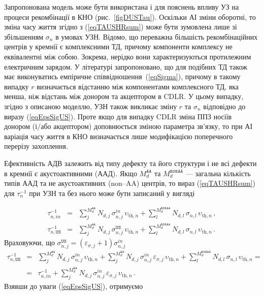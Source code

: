 Запропонована модель може бути використана і для пояснень впливу УЗ на процеси рекомбінації в КНО (рис.~\ref{figDUSTau}).
Оскільки АІ зміни оборотні, то зміна часу життя згідно з (\ref{eqTAUSHRsum}) може бути зумовлена лише зі збільшенням
$\sigma_n$ в умовах УЗН.
Відомо, що переважна більшість рекомбінаційних центрів у кремнії є комплексними ТД,
причому компоненти комплексу не еквівалентні між собою.
Зокрема, нерідко вони характеризуються протилежним електричним зарядом.
У літературі \cite{CDLR:R2} запропоновано, що для подібних ТД також має виконуватись емпіричне співвідношення~(\ref{eqSigma}),
причому в такому випадку $r$ визначається відстанню між компонентами комплексного ТД, яка  менша, ніж відстань між донором та акцептором в CDLR.
У цьому випадку, згідно з описаною моделлю, УЗН також викликає зміну $r$ та $\sigma_n$ відповідно до виразу (\ref{eqEpsSigUS}).
Проте якщо для випадку CDLR зміна ППЗ носіїв донором (і/або акцептором) доповнюється зміною параметра зв'язку,
то при АІ варіація часу життя в КНО визначається лише модифікацією поперечного перерізу захоплення.

Ефективність АДВ залежить від типу дефекту та його структури \cite{UST:Medvid}
і не всі дефекти в кремнії є акустоактивними (ААД).
Якщо $M_d^\mathtt{AA}$ та $M_d^\mathtt{nonAA}$ --- загальна кількість типів ААД та не акустоактивних (non--AA) центрів,
то вираз (\ref{eqTAUSHRsum}) для $\tau_{n}^{-1}$ при УЗН та без нього може бути записаний у вигляді

\begin{eqnarray}
\nonumber\tau_{n,in}^{-1}&=&\sum_j^{M_d^\mathtt{AA}}N_{d,j}\,\sigma_{n,j}^{in}\,\upsilon_{\mathrm{th},n}+
\sum_l^{M_d^\mathtt{nonAA}}N_{d,l}\,\sigma_{n,l}\,\upsilon_{\mathrm{th},n}\,,\\
\nonumber\tau_{n,\mathtt{US}}^{-1}&=&\sum_j^{M_d^\mathtt{AA}}N_{d,j}\,\sigma_{n,j}^\mathtt{US}\,\upsilon_{\mathrm{th},n}+
\sum_l^{M_d^\mathtt{nonAA}}N_{d,l}\,\sigma_{n,l}\,\upsilon_{\mathrm{th},n}\,.
\end{eqnarray}
Враховуючи, що $\sigma_{n,j}^\mathtt{US}=(\varepsilon_{\sigma,j}+1)\sigma_{n,j}^{in}$
\begin{eqnarray}
\label{eqEpsSigUSA}
\tau_{n,\mathtt{US}}^{-1}&=&\sum_j^{M_d^\mathtt{AA}}N_{d,j}\,\sigma_{n,j}^{in}\,\upsilon_{\mathrm{th},n}+
\sum_j^{M_d^\mathtt{AA}}N_{d,j}\,\sigma_{n,j}^{in}\,\varepsilon_{\sigma,j}\,\upsilon_{\mathrm{th},n}+
\sum_l^{M_d^\mathtt{nonAA}}N_{d,l}\,\sigma_{n,l}\,\upsilon_{\mathrm{th},n}=\nonumber\\
&=&\tau_{n,in}^{-1}+\sum_j^{M_d^\mathtt{AA}}N_{d,j}\,\sigma_{n,j}^{in}\,\varepsilon_{\sigma,j}\,\upsilon_{\mathrm{th},n}\,.
\end{eqnarray}
Взявши до уваги (\ref{eqEpsSigUS}), отримуємо

